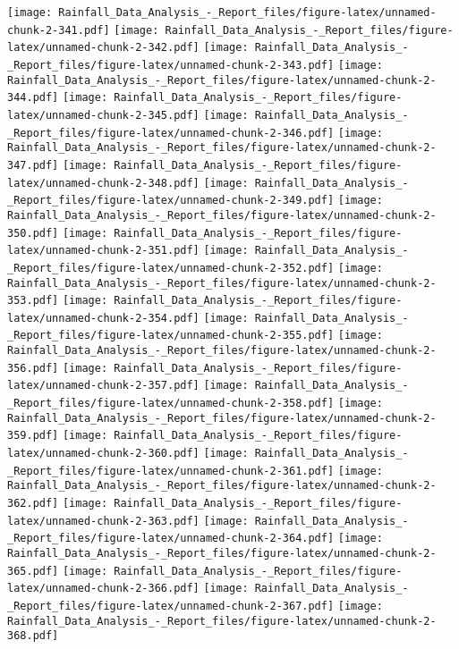 \documentclass[
]{article}
\begin{document}
\texttt{[image: Rainfall\_Data\_Analysis\_-\_Report\_files/figure-latex/unnamed-chunk-2-341.pdf]}
\texttt{[image: Rainfall\_Data\_Analysis\_-\_Report\_files/figure-latex/unnamed-chunk-2-342.pdf]}
\texttt{[image: Rainfall\_Data\_Analysis\_-\_Report\_files/figure-latex/unnamed-chunk-2-343.pdf]}
\texttt{[image: Rainfall\_Data\_Analysis\_-\_Report\_files/figure-latex/unnamed-chunk-2-344.pdf]}
\texttt{[image: Rainfall\_Data\_Analysis\_-\_Report\_files/figure-latex/unnamed-chunk-2-345.pdf]}
\texttt{[image: Rainfall\_Data\_Analysis\_-\_Report\_files/figure-latex/unnamed-chunk-2-346.pdf]}
\texttt{[image: Rainfall\_Data\_Analysis\_-\_Report\_files/figure-latex/unnamed-chunk-2-347.pdf]}
\texttt{[image: Rainfall\_Data\_Analysis\_-\_Report\_files/figure-latex/unnamed-chunk-2-348.pdf]}
\texttt{[image: Rainfall\_Data\_Analysis\_-\_Report\_files/figure-latex/unnamed-chunk-2-349.pdf]}
\texttt{[image: Rainfall\_Data\_Analysis\_-\_Report\_files/figure-latex/unnamed-chunk-2-350.pdf]}
\texttt{[image: Rainfall\_Data\_Analysis\_-\_Report\_files/figure-latex/unnamed-chunk-2-351.pdf]}
\texttt{[image: Rainfall\_Data\_Analysis\_-\_Report\_files/figure-latex/unnamed-chunk-2-352.pdf]}
\texttt{[image: Rainfall\_Data\_Analysis\_-\_Report\_files/figure-latex/unnamed-chunk-2-353.pdf]}
\texttt{[image: Rainfall\_Data\_Analysis\_-\_Report\_files/figure-latex/unnamed-chunk-2-354.pdf]}
\texttt{[image: Rainfall\_Data\_Analysis\_-\_Report\_files/figure-latex/unnamed-chunk-2-355.pdf]}
\texttt{[image: Rainfall\_Data\_Analysis\_-\_Report\_files/figure-latex/unnamed-chunk-2-356.pdf]}
\texttt{[image: Rainfall\_Data\_Analysis\_-\_Report\_files/figure-latex/unnamed-chunk-2-357.pdf]}
\texttt{[image: Rainfall\_Data\_Analysis\_-\_Report\_files/figure-latex/unnamed-chunk-2-358.pdf]}
\texttt{[image: Rainfall\_Data\_Analysis\_-\_Report\_files/figure-latex/unnamed-chunk-2-359.pdf]}
\texttt{[image: Rainfall\_Data\_Analysis\_-\_Report\_files/figure-latex/unnamed-chunk-2-360.pdf]}
\texttt{[image: Rainfall\_Data\_Analysis\_-\_Report\_files/figure-latex/unnamed-chunk-2-361.pdf]}
\texttt{[image: Rainfall\_Data\_Analysis\_-\_Report\_files/figure-latex/unnamed-chunk-2-362.pdf]}
\texttt{[image: Rainfall\_Data\_Analysis\_-\_Report\_files/figure-latex/unnamed-chunk-2-363.pdf]}
\texttt{[image: Rainfall\_Data\_Analysis\_-\_Report\_files/figure-latex/unnamed-chunk-2-364.pdf]}
\texttt{[image: Rainfall\_Data\_Analysis\_-\_Report\_files/figure-latex/unnamed-chunk-2-365.pdf]}
\texttt{[image: Rainfall\_Data\_Analysis\_-\_Report\_files/figure-latex/unnamed-chunk-2-366.pdf]}
\texttt{[image: Rainfall\_Data\_Analysis\_-\_Report\_files/figure-latex/unnamed-chunk-2-367.pdf]}
\texttt{[image: Rainfall\_Data\_Analysis\_-\_Report\_files/figure-latex/unnamed-chunk-2-368.pdf]}
\end{document}
